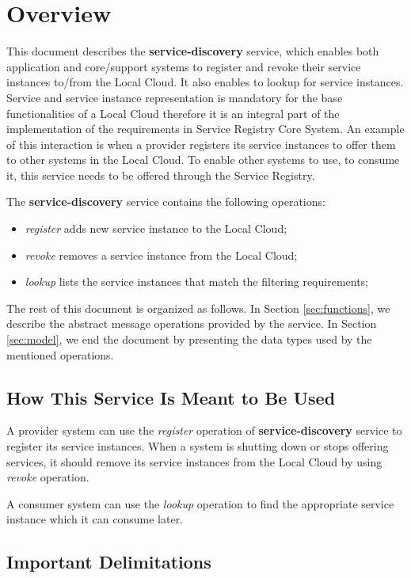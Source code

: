 \documentclass[a4paper]{arrowhead}
\begin{document}
\section{Overview}
\label{sec:overview}
This document describes the \textbf{service-discovery} service, which enables both application and core/support systems to register and revoke their service instances to/from the Local Cloud. It also enables to lookup for service instances. Service and service instance representation is mandatory for the base functionalities of a Local Cloud therefore it is an integral part of the implementation of the requirements in Service Registry Core System. An example of this interaction is when a provider registers its service instances to offer them to other systems in the Local Cloud. To enable other systems to use, to consume it, this service needs to be offered through the Service Registry.

The \textbf{service-discovery} service contains the following operations:

\begin{itemize}
    \item \textit{register} adds new service instance to the Local Cloud;
    \item \textit{revoke} removes a service instance from the Local Cloud;
    \item \textit{lookup} lists the service instances that match the filtering requirements;
\end{itemize}

The rest of this document is organized as follows.
In Section \ref{sec:functions}, we describe the abstract message operations provided by the service.
In Section \ref{sec:model}, we end the document by presenting the data types used by the mentioned operations.

\subsection{How This Service Is Meant to Be Used}
A provider system can use the \textit{register} operation of \textbf{service-discovery} service to register its service instances. When a system is shutting down or stops offering services, it should remove its service instances from the Local Cloud by using \textit{revoke} operation.

A consumer system can use the \textit{lookup} operation to find the appropriate service instance which it can consume later.

\subsection{Important Delimitations}
\label{sec:delimitations}
\end{document}
